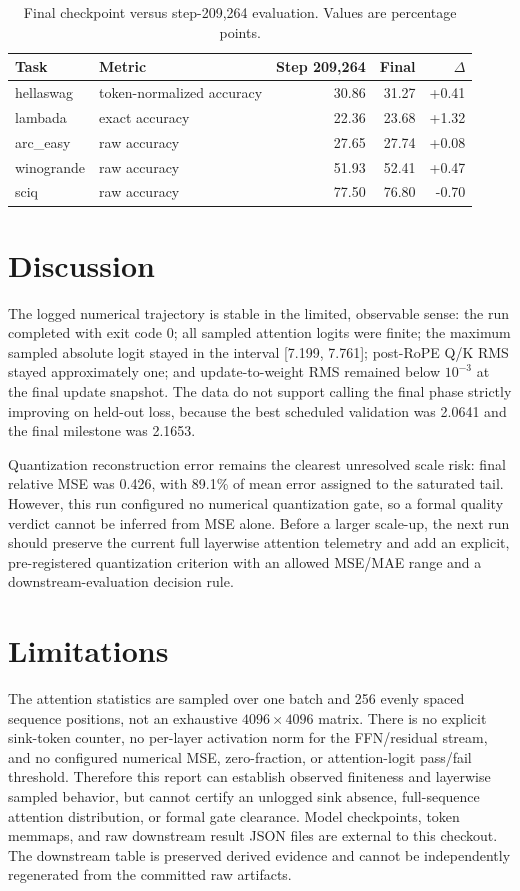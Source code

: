 \documentclass[10pt]{article}
\begin{document}
\begin{table}[H]\centering
\caption{Final checkpoint versus step-209,264 evaluation. Values are percentage points.}\label{tab:eval}
\begin{tabular}{llrrr}\toprule
Task & Metric & Step 209,264 & Final & $\Delta$ \\\midrule
hellaswag & token-normalized accuracy & 30.86 & 31.27 & +0.41 \\
lambada & exact accuracy & 22.36 & 23.68 & +1.32 \\
arc\_easy & raw accuracy & 27.65 & 27.74 & +0.08 \\
winogrande & raw accuracy & 51.93 & 52.41 & +0.47 \\
sciq & raw accuracy & 77.50 & 76.80 & -0.70 \\
\bottomrule\end{tabular}
\end{table}

\section{Discussion}
The logged numerical trajectory is stable in the limited, observable sense: the run completed with exit code 0; all sampled attention logits were finite; the maximum sampled absolute logit stayed in the interval [7.199, 7.761]; post-RoPE Q/K RMS stayed approximately one; and update-to-weight RMS remained below $10^{-3}$ at the final update snapshot. The data do not support calling the final phase strictly improving on held-out loss, because the best scheduled validation was 2.0641 and the final milestone was 2.1653.

Quantization reconstruction error remains the clearest unresolved scale risk: final relative MSE was 0.426, with 89.1\% of mean error assigned to the saturated tail. However, this run configured no numerical quantization gate, so a formal quality verdict cannot be inferred from MSE alone. Before a larger scale-up, the next run should preserve the current full layerwise attention telemetry and add an explicit, pre-registered quantization criterion with an allowed MSE/MAE range and a downstream-evaluation decision rule.

\section{Limitations}
The attention statistics are sampled over one batch and 256 evenly spaced sequence positions, not an exhaustive $4096\times4096$ matrix. There is no explicit sink-token counter, no per-layer activation norm for the FFN/residual stream, and no configured numerical MSE, zero-fraction, or attention-logit pass/fail threshold. Therefore this report can establish observed finiteness and layerwise sampled behavior, but cannot certify an unlogged sink absence, full-sequence attention distribution, or formal gate clearance. Model checkpoints, token memmaps, and raw downstream result JSON files are external to this checkout. The downstream table is preserved derived evidence and cannot be independently regenerated from the committed raw artifacts.
\end{document}
